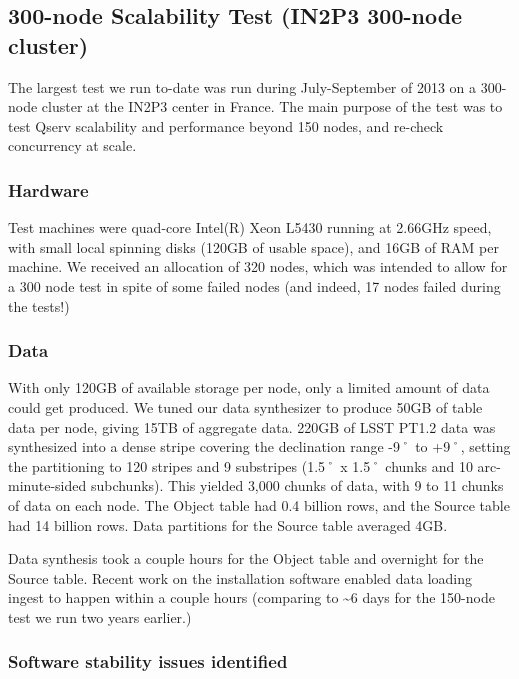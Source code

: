 \documentclass[DM,lsstdraft,toc]{lsstdoc}
\begin{document}
\subsection{300-node Scalability Test (IN2P3 300-node
cluster)}\label{node-scalability-test-in2p3-300-node-cluster}

The largest test we run to-date was run during July-September of 2013 on
a 300-node cluster at the IN2P3 center in France. The main purpose of
the test was to test Qserv scalability and performance beyond 150 nodes,
and re-check concurrency at scale.

\subsubsection{Hardware}\label{hardware-1}

Test machines were quad-core Intel(R) Xeon L5430 running at 2.66GHz
speed, with small local spinning disks (120GB of usable space), and 16GB
of RAM per machine. We received an allocation of 320 nodes, which was
intended to allow for a 300 node test in spite of some failed nodes (and
indeed, 17 nodes failed during the tests!)

\subsubsection{Data}\label{data-1}

With only 120GB of available storage per node, only a limited amount of
data could get produced. We tuned our data synthesizer to produce 50GB
of table data per node, giving 15TB of aggregate data. 220GB of LSST
PT1.2 data was synthesized into a dense stripe covering the declination
range -9˚ to +9˚, setting the partitioning to 120 stripes and 9
substripes (1.5˚ x 1.5˚ chunks and 10 arc-minute-sided subchunks). This
yielded 3,000 chunks of data, with 9 to 11 chunks of data on each node.
The Object table had 0.4 billion rows, and the Source table had 14
billion rows. Data partitions for the Source table averaged 4GB.

Data synthesis took a couple hours for the Object table and overnight
for the Source table. Recent work on the installation software enabled
data loading ingest to happen within a couple hours (comparing to
\textasciitilde{}6 days for the 150-node test we run two years earlier.)

\subsubsection{Software stability issues
identified}\label{software-stability-issues-identified}
\end{document}
